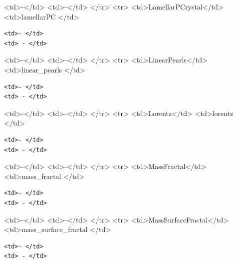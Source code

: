 \textless{}td\textgreater{}-\textless{}/td\textgreater{} \textless{}td\textgreater{}-\textless{}/td\textgreater{} \textless{}/tr\textgreater{} \textless{}tr\textgreater{} \textless{}td\textgreater{}LamellarPCrystal\textless{}/td\textgreater{} \textless{}td\textgreater{}lamellarPC \textless{}/td\textgreater{}

\begin{verbatim}
<td>- </td>
<td> - </td>
\end{verbatim}

\textless{}td\textgreater{}-\textless{}/td\textgreater{} \textless{}td\textgreater{}-\textless{}/td\textgreater{} \textless{}/tr\textgreater{} \textless{}tr\textgreater{} \textless{}td\textgreater{}LinearPearls\textless{}/td\textgreater{} \textless{}td\textgreater{}linear\_pearls \textless{}/td\textgreater{}

\begin{verbatim}
<td>- </td>
<td> - </td>
\end{verbatim}

\textless{}td\textgreater{}-\textless{}/td\textgreater{} \textless{}td\textgreater{}-\textless{}/td\textgreater{} \textless{}/tr\textgreater{} \textless{}tr\textgreater{} \textless{}td\textgreater{}Lorentz\textless{}/td\textgreater{} \textless{}td\textgreater{}lorentz \textless{}/td\textgreater{}

\begin{verbatim}
<td>- </td>
<td> - </td>
\end{verbatim}

\textless{}td\textgreater{}-\textless{}/td\textgreater{} \textless{}td\textgreater{}-\textless{}/td\textgreater{} \textless{}/tr\textgreater{} \textless{}tr\textgreater{} \textless{}td\textgreater{}MassFractal\textless{}/td\textgreater{} \textless{}td\textgreater{}mass\_fractal \textless{}/td\textgreater{}

\begin{verbatim}
<td>- </td>
<td> - </td>
\end{verbatim}

\textless{}td\textgreater{}-\textless{}/td\textgreater{} \textless{}td\textgreater{}-\textless{}/td\textgreater{} \textless{}/tr\textgreater{} \textless{}tr\textgreater{} \textless{}td\textgreater{}MassSurfaceFractal\textless{}/td\textgreater{} \textless{}td\textgreater{}mass\_surface\_fractal \textless{}/td\textgreater{}

\begin{verbatim}
<td>- </td>
<td> - </td>
\end{verbatim}


